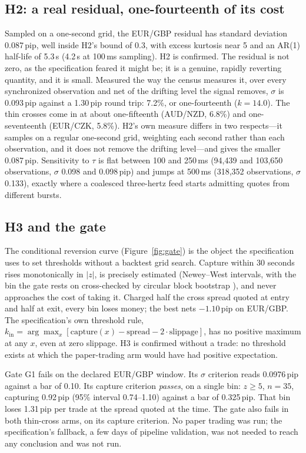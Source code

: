 \documentclass[11pt]{article}
\begin{document}
\subsection{H2: a real residual, one-fourteenth of its cost}

Sampled on a one-second grid, the EUR/GBP residual has standard
deviation 0.087\,pip, well inside H2's bound of 0.3, with excess
kurtosis near 5 and an AR(1) half-life of 5.3\,s (4.2\,s at 100\,ms
sampling). H2 is confirmed. The residual is not zero, as the
specification feared it might be; it is a genuine, rapidly reverting
quantity, and it is small. Measured the way the census measures it,
over every synchronized observation and net of the drifting level the
signal removes, $\sigma$ is 0.093\,pip against a 1.30\,pip round trip:
7.2\%, or one-fourteenth ($k = 14.0$). The thin crosses come in at
about one-fifteenth (AUD/NZD, 6.8\%) and one-seventeenth (EUR/CZK,
5.8\%). H2's own measure differs in two respects---it samples on a
regular one-second grid, weighting each second rather than each
observation, and it does not remove the drifting level---and gives the
smaller 0.087\,pip. Sensitivity to $\tau$ is flat between 100
and 250\,ms (94{,}439 and 103{,}650 observations, $\sigma$ 0.098 and
0.098\,pip) and jumps at 500\,ms (318{,}352 observations, $\sigma$
0.133), exactly where a coalesced three-hertz feed starts admitting
quotes from different bursts.

\subsection{H3 and the gate}

The conditional reversion curve (Figure~\ref{fig:gate}) is the object
the specification uses to set thresholds without a backtest grid
search. Capture within 30 seconds rises monotonically in $|z|$, is
precisely estimated (Newey--West \cite{neweywest1987} intervals,
with the bin the gate rests on cross-checked by circular block
bootstrap \cite{kunsch1989}), and
never approaches the cost of taking it. Charged half the cross spread
quoted at entry and half at exit, every bin loses money; the best nets
$-1.10$\,pip on EUR/GBP. The specification's own threshold rule,
$k_{\text{in}} = \arg\max_x [\text{capture}(x) - \text{spread} -
2\cdot\text{slippage}]$, has no positive maximum at any $x$, even at
zero slippage. H3 is confirmed without a trade: no threshold exists at
which the paper-trading arm would have had positive expectation.

Gate G1 fails on the declared EUR/GBP window. Its $\sigma$ criterion
reads 0.0976\,pip against a bar of 0.10. Its capture criterion
\emph{passes}, on a single bin: $z \ge 5$, $n = 35$, capturing
0.92\,pip (95\% interval 0.74--1.10) against a bar of 0.325\,pip.
That bin loses 1.31\,pip per trade at the spread quoted at the time.
The gate also fails in both thin-cross arms, on its capture criterion.
No paper trading was run; the specification's fallback, a few days of
pipeline validation, was not needed to reach any conclusion and was
not run.
\end{document}

